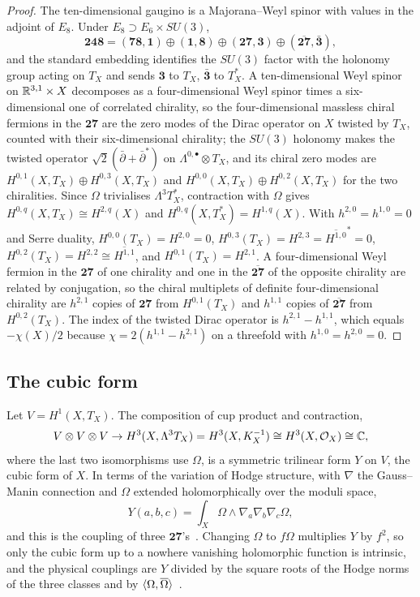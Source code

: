 \begin{proof}
The ten-dimensional gaugino is a Majorana--Weyl spinor with values in the
adjoint of $E_8$. Under $E_8\supset E_6\times SU(3)$,
\[
\mathbf{248}=(\mathbf{78},\mathbf1)\oplus(\mathbf1,\mathbf8)\oplus
(\mathbf{27},\mathbf3)\oplus(\overline{\mathbf{27}},\bar{\mathbf3}),
\]
and the standard embedding identifies the $SU(3)$ factor with the holonomy
group acting on $T_X$ and sends $\mathbf3$ to $T_X$, $\bar{\mathbf3}$ to
$T_X^*$. A ten-dimensional Weyl spinor on $\mathbb{R}^{3,1}\times X$ decomposes as
a four-dimensional Weyl spinor times a six-dimensional one of correlated
chirality, so the four-dimensional massless chiral fermions in the
$\mathbf{27}$ are the zero modes of the Dirac operator on $X$ twisted by
$T_X$, counted with their six-dimensional chirality; the $SU(3)$ holonomy
makes the twisted operator $\sqrt2(\bar\partial+\bar\partial^*)$ on
$\Lambda^{0,\bullet}\otimes T_X$, and its chiral zero modes are
$H^{0,1}(X,T_X)\oplus H^{0,3}(X,T_X)$ and $H^{0,0}(X,T_X)\oplus
H^{0,2}(X,T_X)$ for the two chiralities. Since $\Omega$ trivialises
$\Lambda^3T_X^*$, contraction with $\Omega$ gives $H^{0,q}(X,T_X)\cong
H^{2,q}(X)$ and $H^{0,q}(X,T_X^*)=H^{1,q}(X)$. With $h^{2,0}=h^{1,0}=0$
and Serre duality, $H^{0,0}(T_X)=H^{2,0}=0$, $H^{0,3}(T_X)=
H^{2,3}=\overline{H^{1,0}}^*=0$, $H^{0,2}(T_X)=H^{2,2}\cong
\overline{H^{1,1}}$, and $H^{0,1}(T_X)=H^{2,1}$. A four-dimensional Weyl
fermion in the $\mathbf{27}$ of one chirality and one in the
$\overline{\mathbf{27}}$ of the opposite chirality are related by
conjugation, so the chiral multiplets of definite four-dimensional
chirality are $h^{2,1}$ copies of $\mathbf{27}$ from $H^{0,1}(T_X)$ and
$h^{1,1}$ copies of $\overline{\mathbf{27}}$ from $H^{0,2}(T_X)$. The index
of the twisted Dirac operator is $h^{2,1}-h^{1,1}$, which equals $-\chi(X)/2$
because $\chi=2(h^{1,1}-h^{2,1})$ on a threefold with $h^{1,0}=h^{2,0}=0$.
\end{proof}

\subsection{The cubic form}

Let $V=H^1(X,T_X)$. The composition of cup product and contraction,
\[
V\otimes V\otimes V\to H^3(X,\Lambda^3T_X)=H^3(X,K_X^{-1})\cong
H^3(X,\mathcal{O}_X)\cong\mathbb{C},
\]
where the last two isomorphisms use $\Omega$, is a symmetric trilinear form
$Y$ on $V$, the cubic form of $X$. In terms of the variation of Hodge
structure, with $\nabla$ the Gauss--Manin connection and $\Omega$ extended
holomorphically over the moduli space,
\begin{equation}\label{eq:yukawa}
Y(a,b,c)=\int_X\Omega\wedge\nabla_a\nabla_b\nabla_c\Omega,
\end{equation}
and this is the coupling of three $\mathbf{27}$'s~\cite{Str85}. Changing
$\Omega$ to $f\Omega$ multiplies $Y$ by $f^2$, so only the cubic form up to
a nowhere vanishing holomorphic function is intrinsic, and the physical
couplings are $Y$ divided by the square roots of the Hodge norms of the three
classes and by $\langle \Omega,\overline\Omega\rangle$~\cite{DKL90,CdlO91}.

